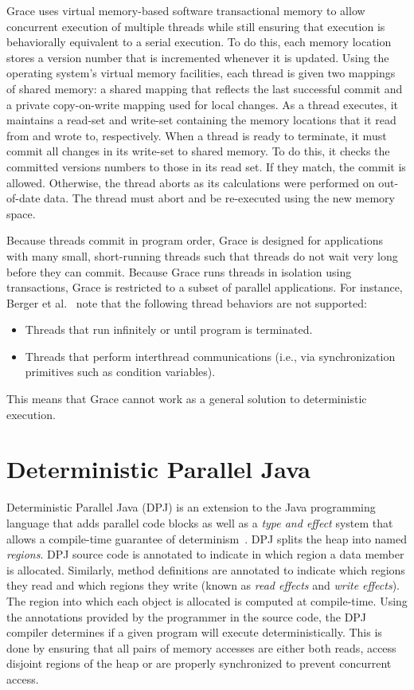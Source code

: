 Grace uses virtual memory-based software transactional memory to allow
concurrent execution of multiple threads while still ensuring that
execution is behaviorally equivalent to a serial execution.  To do
this, each memory location stores a version number that is incremented
whenever it is updated.  Using the operating system's virtual memory
facilities, each thread is given two mappings of shared memory: a
shared mapping that reflects the last successful commit and a private
copy-on-write mapping used for local changes.  As a thread executes,
it maintains a read-set and write-set containing the memory locations
that it read from and wrote to, respectively.  When a thread is ready
to terminate, it must commit all changes in its write-set to shared
memory.  To do this, it checks the committed versions numbers to those
in its read set.  If they match, the commit is allowed.  Otherwise,
the thread aborts as its calculations were performed on out-of-date
data.  The thread must abort and be re-executed using the new memory
space.

Because threads commit in program order, Grace is designed for
applications with many small, short-running threads such that threads
do not wait very long before they can commit. Because Grace runs
threads in isolation using transactions, Grace is restricted to a
subset of parallel applications.  For instance, Berger et
al.~\cite{grace} note that the following thread behaviors are not
supported:

\begin{itemize}
\item Threads that run infinitely or until program is terminated.

\item Threads that perform interthread communications (i.e., via
  synchronization primitives such as condition variables).
\end{itemize}

This means that Grace cannot work as a general solution to
deterministic execution.

\section{Deterministic Parallel Java}

Deterministic Parallel Java (DPJ) is an extension to the Java
programming language that adds parallel code blocks as well as a
\emph{type and effect} system that allows a compile-time guarantee of
determinism~\cite{dpj}.  DPJ splits the heap into named
\emph{regions}.  DPJ source code is annotated to indicate in which
region a data member is allocated.  Similarly, method definitions are
annotated to indicate which regions they read and which regions they
write (known as \emph{read effects} and \emph{write effects}).  The
region into which each object is allocated is computed at
compile-time.  Using the annotations provided by the programmer in the
source code, the DPJ compiler determines if a given program will
execute deterministically.  This is done by ensuring that all pairs of
memory accesses are either both reads, access disjoint regions of the
heap or are properly synchronized to prevent concurrent access.

